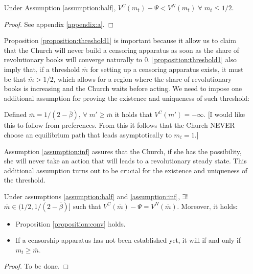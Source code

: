 \begin{proposition}\label{proposition:threshold1}
Under Assumption \ref{assumption:half}, $V^C(m_t)-\Psi<V^N(m_t) \; \forall \; m_t\leq 1/2$.
\end{proposition}
\begin{proof}
See appendix \ref{appendix:a}.
\end{proof}

Proposition \ref{proposition:threshold1} is important because it allow us to claim that the Church will never build a censoring apparatus as soon as the share of revolutionary books will converge naturally to 0. \ref{proposition:threshold1} also imply that, if a threshold $\overline{m}$ for setting up a censoring apparatus exists, it must be that $\overline{m}>1/2$, which allows for a region where the share of revolutionary books is increasing and the Church waits before acting. We need to impose one additional assumption for proving the existence and uniqueness of such threshold:
\begin{assumption}\label{assumption:inf}
Defined $\overline{m}=1/(2-\overline{\beta})$, $\forall\;m'\geq\overline{m}$ it holds that $V^C(m')=-\infty$. [I would like this to follow from preferences. From this it follows that the Church NEVER choose an equilibrium path that leads asymptotically to $m_t=1$.]
\end{assumption}
Assumption \ref{assumption:inf} assures that the Church, if she has the possibility, she will never take an action that will leads to a revolutionary steady state. This additional assumption turns out to be crucial for the existence and uniqueness of the threshold.
\begin{proposition}\label{proposition:threshold}
Under assumptions \ref{assumption:half} and \ref{assumption:inf}, $\exists! $ $\overline{m}\in(1/2,1/(2-\overline{\beta})]$ such that $V^C(\overline{m})-\Psi=V^N(\overline{m})$. Moreover, it holds:
\begin{itemize}
	\item Proposition \ref{proposition:conv} holds.
	\item If a censorship apparatus has not been established yet, it will if and only if $m_t\geq\overline{m}$.
\end{itemize}
\end{proposition}

\begin{proof}
To be done.
\end{proof}


